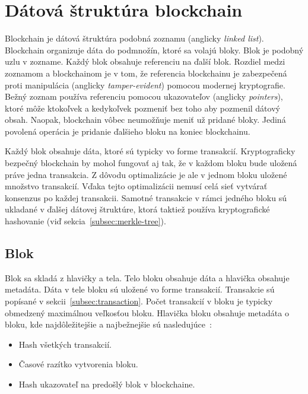 \section{Dátová štruktúra blockchain}\label{sec:data-struct-blockchain}
Blockchain je dátová štruktúra podobná zoznamu (anglicky \textit{linked list}). Blockchain organizuje dáta do podmnožín, ktoré sa volajú bloky. Blok je podobný uzlu v zozname. Každý blok obsahuje referenciu na ďalší blok. Rozdiel medzi zoznamom a blockchainom je v tom, že referencia blockchainu je zabezpečená proti manipulácia (anglicky \textit{tamper-evident}) pomocou modernej kryptografie. Bežný zoznam používa referenciu pomocou ukazovateľov (anglicky \textit{pointers}), ktoré môže ktokoľvek a kedykoľvek pozmeniť bez toho aby pozmenil dátový obsah. Naopak, blockchain vôbec neumožňuje meniť už pridané bloky. Jediná povolená operácia je pridanie ďalšieho bloku na koniec blockchainu.~\cite{horizenAcademy}

Každý blok obsahuje dáta, ktoré sú typicky vo forme transakcií. Kryptograficky bezpečný blockchain by mohol fungovať aj tak, že v každom bloku bude uložená práve jedna transakcia. Z dôvodu optimalizácie je ale v jednom bloku uložené množstvo transakcií. Vďaka tejto optimalizácii nemusí celá sieť vytvárať konsenzus po každej transakcii. Samotné transakcie v rámci jedného bloku sú ukladané v ďalšej dátovej štruktúre, ktorá taktiež používa kryptografické hashovanie (viď sekcia~\ref{subsec:merkle-tree}).~\cite{narayanan2016bitcoin}

\subsection{Blok}\label{subsec:block}

Blok sa skladá z hlavičky a tela. Telo bloku obsahuje dáta a hlavička obsahuje metadáta. Dáta v tele bloku sú uložené vo forme transakcií. Transakcie sú popísané v sekcii~\ref{subsec:transaction}. Počet transakcií v bloku je typicky obmedzený maximálnou veľkosťou bloku.
Hlavička bloku obsahuje metadáta o bloku, kde najdôležitejšie a najbežnejšie sú nasledujúce~\cite{zhengBlockchainOverview}:
\begin{itemize}
	\item Hash všetkých transakcií.
	\item Časové razítko vytvorenia bloku.
	\item Hash ukazovateľ na predošlý blok v blockchaine.
\end{itemize} 

